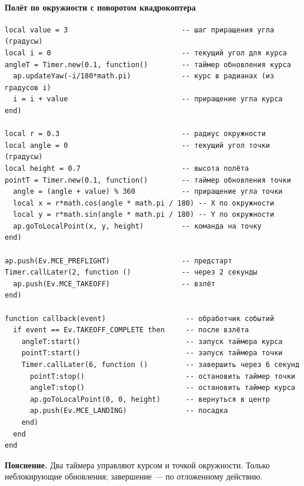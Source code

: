 \paragraph{Полёт по окружности с поворотом квадрокоптера}
\begin{verbatim}
local value = 3                           -- шаг приращения угла (градусы)
local i = 0                               -- текущий угол для курса
angleT = Timer.new(0.1, function()        -- таймер обновления курса
  ap.updateYaw(-i/180*math.pi)            -- курс в радианах (из градусов i)
  i = i + value                           -- приращение угла курса
end)

local r = 0.3                             -- радиус окружности
local angle = 0                           -- текущий угол точки (градусы)
local height = 0.7                        -- высота полёта
pointT = Timer.new(0.1, function()        -- таймер обновления точки
  angle = (angle + value) % 360           -- приращение угла точки
  local x = r*math.cos(angle * math.pi / 180) -- X по окружности
  local y = r*math.sin(angle * math.pi / 180) -- Y по окружности
  ap.goToLocalPoint(x, y, height)         -- команда на точку
end)

ap.push(Ev.MCE_PREFLIGHT)                 -- предстарт
Timer.callLater(2, function ()            -- через 2 секунды
  ap.push(Ev.MCE_TAKEOFF)                 -- взлёт
end)

function callback(event)                   -- обработчик событий
  if event == Ev.TAKEOFF_COMPLETE then     -- после взлёта
    angleT:start()                         -- запуск таймера курса
    pointT:start()                         -- запуск таймера точки
    Timer.callLater(6, function ()         -- завершить через 6 секунд
      pointT:stop()                        -- остановить таймер точки
      angleT:stop()                        -- остановить таймер курса
      ap.goToLocalPoint(0, 0, height)      -- вернуться в центр
      ap.push(Ev.MCE_LANDING)              -- посадка
    end)
  end
end

\end{verbatim}
\textbf{Пояснение.} Два таймера управляют курсом и точкой окружности. Только неблокирующие обновления; завершение — по отложенному действию.
